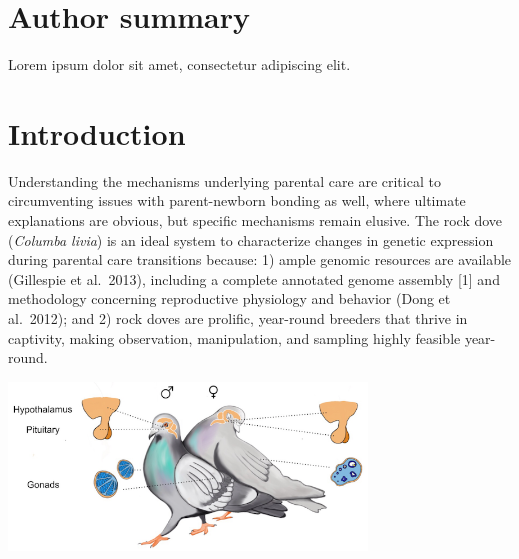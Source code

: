 \documentclass[10pt,letterpaper]{article}
\begin{document}
\section*{Author summary}
Lorem ipsum dolor sit amet, consectetur adipiscing elit.

\linenumbers

\hypertarget{introduction}{%
\section{Introduction}\label{introduction}}

Understanding the mechanisms underlying parental care are critical to
circumventing issues with parent-newborn bonding as well, where ultimate
explanations are obvious, but specific mechanisms remain elusive. The
rock dove (\emph{Columba livia}) is an ideal system to characterize
changes in genetic expression during parental care transitions because:
1) ample genomic resources are available (Gillespie et al.~2013),
including a complete annotated genome assembly {[}1{]} and methodology
concerning reproductive physiology and behavior (Dong et al.~2012); and
2) rock doves are prolific, year-round breeders that thrive in
captivity, making observation, manipulation, and sampling highly
feasible year-round.

\includegraphics[width=360px]{../figures/images/PigeonHPGaxis}
\end{document}
